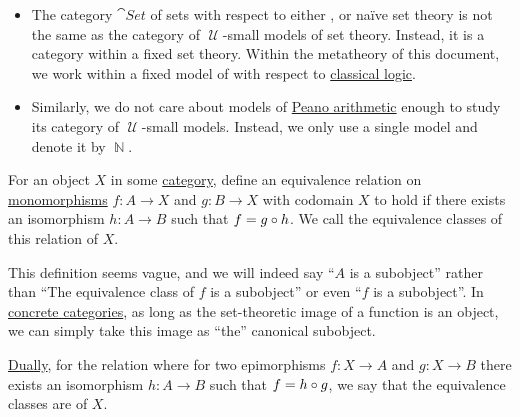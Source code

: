 \begin{example}
\begin{itemize}
    \item The category \hyperref[def:category_of_small_sets]{\( \cat{Set} \)} of sets with respect to either ,  or na\"ive set theory is not the same as the category of \( \mscrU \)-small models of set theory. Instead, it is a category within a fixed set theory. Within the metatheory of this document, we work within a fixed model of  with respect to \hyperref[rem:classical_logic]{classical logic}.

    \item Similarly, we do not care about models of \hyperref[def:peano_arithmetic]{Peano arithmetic} enough to study its category of \( \mscrU \)-small models. Instead, we only use a single model and denote it by \( \BbbN \).
  \end{itemize}
\end{example}

\begin{definition}\label{def:subobject_and_quotient}
  For an object \( X \) in some \hyperref[def:category]{category}, define an equivalence relation on \hyperref[def:morphism_invertibility/left_cancellative]{monomorphisms} \( f: A \to X \) and \( g: B \to X \) with codomain \( X \) to hold if there exists an isomorphism \( h: A \to B \) such that \( f = g \bincirc h \). We call the equivalence classes of this relation  of \( X \).

  This definition seems vague, and we will indeed say \enquote{\( A \) is a subobject} rather than \enquote{The equivalence class of \( f \) is a subobject} or even \enquote{\( f \) is a subobject}. In \hyperref[rem:concrete_categories]{concrete categories}, as long as the set-theoretic image of a function is an object, we can simply take this image as \enquote{the} canonical subobject.

  \hyperref[thm:categorical_principle_of_duality]{Dually}, for the relation where for two epimorphisms \( f: X \to A \) and \( g: X \to B \) there exists an isomorphism \( h: A \to B \) such that \( f = h \bincirc g \), we say that the equivalence classes are  of \( X \).
\end{definition}

